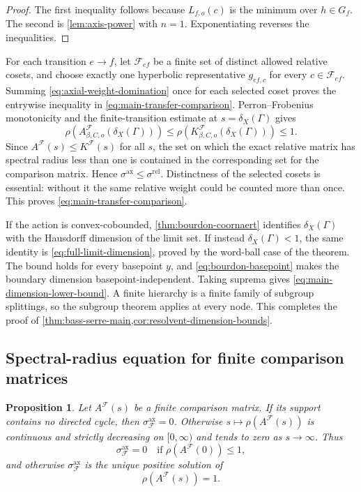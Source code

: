 \documentclass[11pt]{article}
\newtheorem{proposition}[proposition]{Proposition}
\theoremstyle{definition}
\newcommand{\ax}{\mathrm{ax}}
\newcommand{\rel}{\mathrm{rel}}
\begin{document}
\begin{proof}
The first inequality follows because $L_{f,o}(c)$ is the minimum over $h\in G_f$.  The second
is \cref{lem:axis-power} with $n=1$.  Exponentiating reverses the inequalities.
\end{proof}

For each transition $e\to f$, let $\mathcal F_{ef}$ be a finite set of distinct allowed
relative cosets, and choose exactly one hyperbolic representative $g_{ef,c}$ for every
$c\in\mathcal F_{ef}$.  Summing \eqref{eq:axial-weight-domination} once for each selected
coset proves the entrywise inequality in \eqref{eq:main-transfer-comparison}.  Perron--Frobenius
monotonicity and the finite-transition estimate at $s=\delta_X(\Gamma)$ gives
\[
 \rho(A^{\mathcal F}_{\beta,C,o}(\delta_X(\Gamma)))
 \le\rho(K^{\mathcal F}_{\beta,C,o}(\delta_X(\Gamma)))\le1.
\]
Since $A^{\mathcal F}(s)\le K^{\mathcal F}(s)$ for all $s$, the set on which the exact relative
matrix has spectral radius less than one is contained in the corresponding set for the comparison matrix.  Hence $\sigma^{\ax}\le\sigma^{\rel}$.  Distinctness of the selected cosets is essential:
without it the same relative weight could be counted more than once.  This proves
\eqref{eq:main-transfer-comparison}.

If the action is convex-cobounded, \cref{thm:bourdon-coornaert} identifies $\delta_X(\Gamma)$ with the Hausdorff dimension of the limit set.  If instead
$\delta_X(\Gamma)<1$, the same identity is \eqref{eq:full-limit-dimension}, proved by the
word-ball case of the theorem.  The bound holds for every basepoint $y$, and
\eqref{eq:bourdon-basepoint} makes the boundary dimension basepoint-independent.  Taking
suprema gives \eqref{eq:main-dimension-lower-bound}.  A finite hierarchy is a finite family of
subgroup splittings, so the subgroup theorem applies at every node.  This completes
the proof of \cref{thm:bass-serre-main,cor:resolvent-dimension-bounds}.

\subsection{Spectral-radius equation for finite comparison matrices}

\begin{proposition}
\label{prop:axis-matrix-root}
Let $A^{\mathcal F}(s)$ be a finite comparison matrix.  If its support contains no directed cycle, then
$\sigma^{\ax}_{\mathcal F}=0$.  Otherwise $s\mapsto\rho(A^{\mathcal F}(s))$ is continuous and strictly decreasing on
$[0,\infty)$ and tends to zero as $s\to\infty$.  Thus
\[
 \sigma^{\ax}_{\mathcal F}=0\quad\text{if }\rho(A^{\mathcal F}(0))\le1,
\]
and otherwise $\sigma^{\ax}_{\mathcal F}$ is the unique positive solution of
\begin{equation}\label{eq:axis-matrix-root}
 \rho(A^{\mathcal F}(s))=1.
\end{equation}
\end{proposition}
\end{document}
